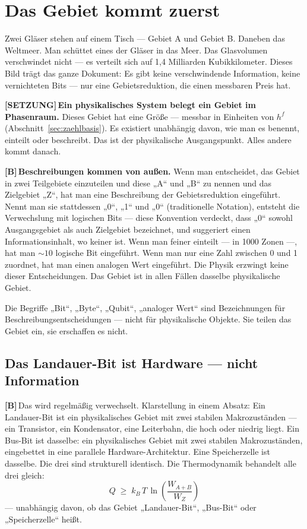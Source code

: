 \documentclass[11pt,a4paper]{article}
\newcommand{\LS}{\textcolor{laySet}{\textbf{\footnotesize\textsf{[SETZUNG]}}}\,}
\newcommand{\LB}{\textcolor{layB}{\textbf{\footnotesize\textsf{[B]}}}\,}
\begin{document}
\section{Das Gebiet kommt zuerst}

Zwei Gläser stehen auf einem Tisch --- Gebiet A und Gebiet B. Daneben das
Weltmeer. Man schüttet eines der Gläser in das Meer. Das Glasvolumen verschwindet
nicht --- es verteilt sich auf 1,4 Milliarden Kubikkilometer. Dieses Bild trägt
das ganze Dokument: Es gibt keine verschwindende Information, keine vernichteten
Bits --- nur eine Gebietsreduktion, die einen messbaren Preis hat.

\LS \textbf{Ein physikalisches System belegt ein Gebiet im Phasenraum.} Dieses
Gebiet hat eine Größe --- messbar in Einheiten von $h^f$ (Abschnitt~\ref{sec:zaehlbasis}).
Es existiert unabhängig davon, wie man es benennt, einteilt oder beschreibt. Das
ist der physikalische Ausgangspunkt. Alles andere kommt danach.

\LB \textbf{Beschreibungen kommen von außen.} Wenn man entscheidet, das Gebiet in
zwei Teilgebiete einzuteilen und diese „A“ und „B“ zu nennen und das Zielgebiet
„Z“, hat man eine Beschreibung der Gebietsreduktion eingeführt. Nennt man sie
stattdessen „0“, „1“ und „0“ (traditionelle Notation), entsteht die Verwechslung
mit logischen Bits --- diese Konvention verdeckt, dass „0“ sowohl Ausgangsgebiet
als auch Zielgebiet bezeichnet, und suggeriert einen Informationsinhalt, wo keiner
ist. Wenn man feiner einteilt --- in 1000 Zonen ---, hat man ${\sim}10$ logische
Bit eingeführt. Wenn man nur eine Zahl zwischen 0 und 1 zuordnet, hat man einen
analogen Wert eingeführt. Die Physik erzwingt keine dieser Entscheidungen. Das
Gebiet ist in allen Fällen dasselbe physikalische Gebiet.

Die Begriffe „Bit“, „Byte“, „Qubit“, „analoger Wert“ sind Bezeichnungen für
Beschreibungsentscheidungen --- nicht für physikalische Objekte. Sie teilen das
Gebiet ein, sie erschaffen es nicht.

\subsection{Das Landauer-Bit ist Hardware --- nicht Information}

\LB Das wird regelmäßig verwechselt. Klarstellung in einem Absatz: Ein
Landauer-Bit ist ein physikalisches Gebiet mit zwei stabilen Makrozuständen ---
ein Transistor, ein Kondensator, eine Leiterbahn, die hoch oder niedrig liegt. Ein
Bus-Bit ist dasselbe: ein physikalisches Gebiet mit zwei stabilen Makrozuständen,
eingebettet in eine parallele Hardware-Architektur. Eine Speicherzelle ist
dasselbe. Die drei sind strukturell identisch. Die Thermodynamik behandelt alle
drei gleich:
\[
  Q \;\ge\; k_B\,T\,\ln\!\left(\frac{W_{A+B}}{W_Z}\right)
\]
--- unabhängig davon, ob das Gebiet „Landauer-Bit“, „Bus-Bit“ oder
„Speicherzelle“ heißt.
\end{document}
